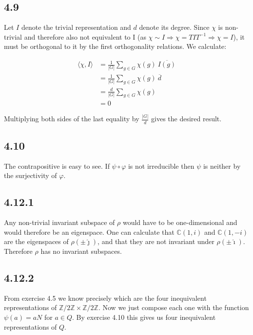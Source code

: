 \documentclass[12pt]{article}
\begin{document}
\subsection*{4.9}

Let $I$ denote the trivial representation and $d$ denote its degree. Since $\chi$ is non-trivial and therefore also not equivalent to I (as $\chi \sim I \Rightarrow \chi = TIT^{-1} \Rightarrow \chi = I$), it must be orthogonal to it by the first orthogonality relations. We calculate:

\begin{equation*}
\begin{split}
\langle \chi, I \rangle
&= \frac{1}{|G|} \sum_{g \in G} \chi(g) \: \overline{I(g)} \\
&= \frac{1}{|G|} \sum_{g \in G} \chi(g) \: \overline{d} \\
&= \frac{d}{|G|} \sum_{g \in G} \chi(g) \\
&= 0
\end{split}
\end{equation*}

Multiplying both sides of the last equality by $\frac{|G|}{d}$ gives the desired result.

\subsection*{4.10}

The contrapositive is easy to see. If $\psi \circ \varphi$ is not irreducible then $\psi$ is neither by the surjectivity of $\varphi$.

\subsection*{4.12.1}

Any non-trivial invariant subspace of $\rho$ would have to be one-dimensional and would therefore be an eigenspace. One can calculate that $\mathbb{C}(1, i)$ and $\mathbb{C}(1, -i)$ are the eigenspaces of $\rho(\pm \hat{\jmath})$, and that they are not invariant under $\rho(\pm \hat{\imath})$. Therefore $\rho$ has no invariant subspaces.

\subsection*{4.12.2}

From exercise 4.5 we know precisely which are the four inequivalent representations of $\mathbb{Z}/2\mathbb{Z} \times \mathbb{Z}/2\mathbb{Z}$. Now we just compose each one with the function $\psi(a) = aN$ for $a \in Q$.
By exercise 4.10 this gives us four inequivalent representations of $Q$.
\end{document}
